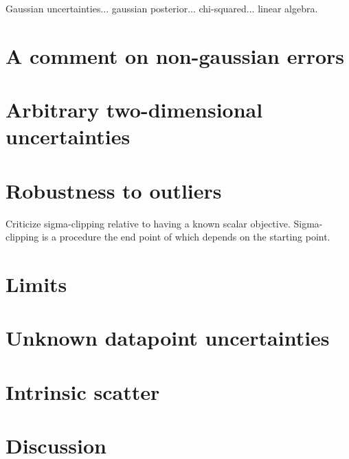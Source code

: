 \documentclass[12pt]{article}
\begin{document}
Gaussian uncertainties... gaussian posterior... chi-squared... linear
algebra.

\section{A comment on non-gaussian errors}

\section{Arbitrary two-dimensional uncertainties}

\section{Robustness to outliers}

Criticize sigma-clipping relative to having a known scalar objective.
Sigma-clipping is a procedure the end point of which depends on the
starting point.

\section{Limits}

\section{Unknown datapoint uncertainties}

\section{Intrinsic scatter}

\section{Discussion}
\end{document}

